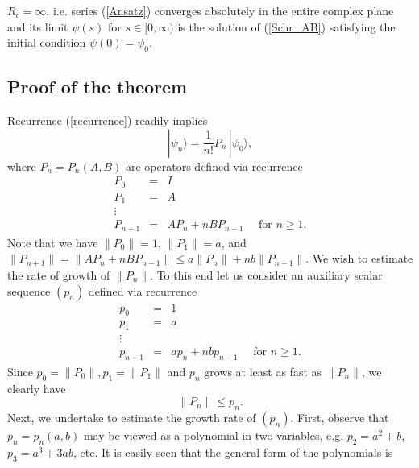 \documentclass[11 pt]{article}
\begin{document}
\begin{theorem}\label{Radius_infty}
$R_c = \infty$, i.e. series (\ref{Ansatz}) converges absolutely in the entire complex plane and its limit $\psi(s)$ for $s\in [0, \infty)$ is the solution of (\ref{Schr_AB}) satisfying the initial condition $\psi(0) = \psi_0$. 
\end{theorem}



\subsection{Proof of the theorem}

Recurrence (\ref{recurrence}) readily implies
\begin{equation}\label{psi_from_P}
|\psi_n\rangle = \frac{1}{n !}P_n\, |\psi_0\rangle, 
\end{equation}
where $P_n = P_n(A,B)$ are operators defined via recurrence
\begin{equation}\label{recurrence_P}
\begin{array}{lll}
P_0 &= &I \\
P_1  &=& A \\
\vdots & &\\
P_{n+1} & = & AP_n + nBP_{n-1}\quad \mbox{ for } n\geq 1.
\end{array}
\end{equation}
Note that we have $\|P_0\| =1$, $\|P_1\| = a$, and $\|P_{n+1}\| = \| AP_n + nBP_{n-1}\| \leq a \|P_n\| +n b \|P_{n-1}\|$. We wish to estimate the rate of growth of $\|P_n\|$. To this end let us consider an auxiliary scalar sequence $(p_n)$ defined via recurrence
\begin{equation}\label{recurrence_p}
\begin{array}{lll}
p_0 &= &1 \\
p_1  &=& a \\
\vdots & &\\
p_{n+1} & = & ap_n + nbp_{n-1}\quad \mbox{ for } n\geq 1.
\end{array}
\end{equation}
Since $p_0 = \|P_0\|, p_1 =\|P_1\|$ and $p_n$ grows at least as fast as $\|P_n\|$, we clearly have 
\begin{equation}\label{stage}
\|P_n\| \leq p_n.
\end{equation}
 Next, we undertake to estimate the growth rate of $(p_n)$. First, observe that $p_n = p_n(a,b)$ may be viewed as a polynomial in two variables, e.g. $p_2 = a^2 +b$, $p_3 = a^3 + 3ab$, etc. It is easily seen that the general form of the polynomials is
\end{document}
